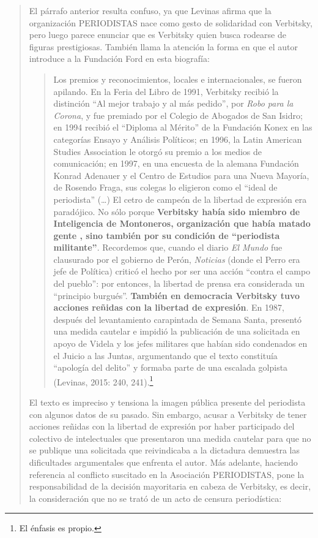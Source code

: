 \begin{quote}
El párrafo anterior resulta confuso, ya que Levinas afirma que la organización PERIODISTAS nace como gesto de solidaridad con Verbitsky, pero luego parece enunciar que es Verbitsky quien busca rodearse de figuras prestigiosas. También llama la atención la forma en que el autor introduce a la Fundación Ford en esta biografía:

\begin{quote}
	Los premios y reconocimientos, locales e internacionales, se fueron apilando. En la Feria del Libro de 1991, Verbitsky recibió la distinción \enquote{Al mejor trabajo y al más pedido}, por \emph{Robo para la Corona}, y fue premiado por el Colegio de Abogados de San Isidro; en 1994 recibió el \enquote{Diploma al Mérito} de la Fundación Konex en las categorías Ensayo y Análisis Políticos; en 1996, la Latin American Studies Association le otorgó su premio a los medios de comunicación; en 1997, en una encuesta de la alemana Fundación Konrad Adenauer y el Centro de Estudios para una Nueva Mayoría, de Rosendo Fraga, sus colegas lo eligieron como el \enquote{ideal de periodista} (\dots) El cetro de campeón de la libertad de expresión era paradójico. No sólo porque \textbf{Verbitsky había sido miembro de Inteligencia de Montoneros, organización que había matado gente , sino también por su condición de \enquote{periodista militante}}. Recordemos que, cuando el diario \emph{El Mundo} fue clausurado por el gobierno de Perón, \emph{Noticias} (donde el Perro era jefe de Política) criticó el hecho por ser una acción \enquote{contra el campo del pueblo}: por entonces, la libertad de prensa era considerada un \enquote{principio burgués}. \textbf{También en democracia Verbitsky tuvo acciones reñidas con la libertad de expresión}. En 1987, después del levantamiento carapintada de Semana Santa, presentó una medida cautelar e impidió la publicación de una solicitada en apoyo de Videla y los jefes militares que habían sido condenados en el Juicio a las Juntas, argumentando que el texto constituía \enquote{apología del delito} y formaba parte de una escalada golpista (Levinas, 2015: 240, 241).\footnote{El énfasis es propio.}
\end{quote}


El texto es impreciso y tensiona la imagen pública presente del periodista con algunos datos de su pasado. Sin embargo, acusar a Verbitsky de tener acciones reñidas con la libertad de expresión por haber participado del colectivo de intelectuales que presentaron una medida cautelar para que no se publique una solicitada que reivindicaba a la dictadura demuestra las dificultades argumentales que enfrenta el autor. Más adelante, haciendo referencia al conflicto suscitado en la Asociación PERIODISTAS, pone la responsabilidad de la decisión mayoritaria en cabeza de Verbitsky, es decir, la consideración que no se trató de un acto de censura periodística:


\end{quote}
